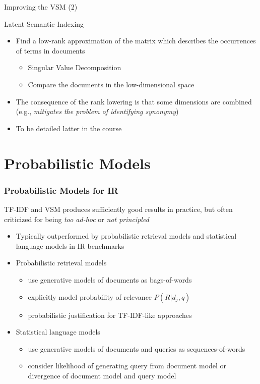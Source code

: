 \documentclass[svgnames]{beamer}
\begin{document}
\begin{frame}{Improving the VSM (2)}
\begin{block}{Latent Semantic Indexing}
\begin{itemize}
\item Find a low-rank approximation of the matrix which describes the occurrences of terms in documents

\begin{itemize}
\item Singular Value Decomposition
\item Compare the documents in the low-dimensional space
\end{itemize}
\item The consequence of the rank lowering is that some dimensions are combined (e.g., \emph{mitigates the problem of identifying synonymy})
\end{itemize}
\begin{itemize}
\item To be detailed latter in the course
\end{itemize}
\end{block}
\end{frame}



\section{Probabilistic Models}
\label{sec:probabilistic}

\begin{frame}  \frametitle{Probabilistic Models for IR}
\begin{block}{}
TF-IDF and VSM produces sufficiently good results in practice, but often criticized for being \emph{too ad-hoc} or \emph{not principled}
\end{block}
\begin{itemize}
\item Typically outperformed by probabilistic retrieval models and statistical language models in IR benchmarks
\item Probabilistic retrieval models
   \begin{itemize}
   \item use generative models of documents as bags-of-words 
   \item explicitly model probability of relevance $P(R|d_j,q)$
   \item probabilistic justification for TF-IDF-like approaches
   \end{itemize}
\item Statistical language models
   \begin{itemize}
   \item use generative models of documents and queries as sequences-of-words
   \item consider likelihood of generating query from document model or divergence of document model and query model
   \end{itemize}
\end{itemize}
\end{frame}
\end{document}
